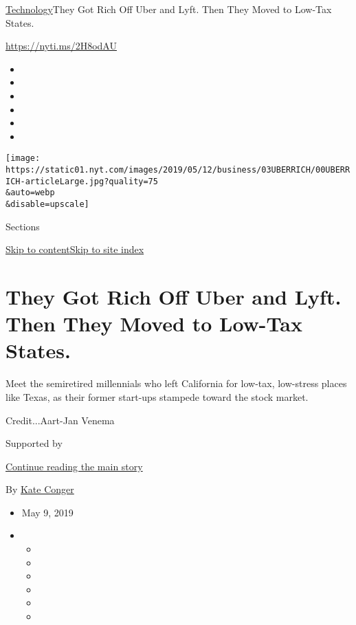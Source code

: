 \href{/section/technology}{Technology}\textbar{}They Got Rich Off Uber
and Lyft. Then They Moved to Low-Tax States.

\url{https://nyti.ms/2H8odAU}

\begin{itemize}
\item
\item
\item
\item
\item
\item
\end{itemize}

\texttt{[image: https://static01.nyt.com/images/2019/05/12/business/03UBERRICH/00UBERRICH-articleLarge.jpg?quality=75\\\&auto=webp\\\&disable=upscale]}

Sections

\protect\hyperlink{site-content}{Skip to
content}\protect\hyperlink{site-index}{Skip to site index}

\hypertarget{they-got-rich-off-uber-and-lyft-then-they-moved-to-low-tax-states}{%
\section{They Got Rich Off Uber and Lyft. Then They Moved to Low-Tax
States.}\label{they-got-rich-off-uber-and-lyft-then-they-moved-to-low-tax-states}}

Meet the semiretired millennials who left California for low-tax,
low-stress places like Texas, as their former start-ups stampede toward
the stock market.

Credit...Aart-Jan Venema

Supported by

\protect\hyperlink{after-sponsor}{Continue reading the main story}

By \href{https://www.nytimes.com/by/kate-conger}{Kate Conger}

\begin{itemize}
\item
  May 9, 2019
\item
  \begin{itemize}
  \item
  \item
  \item
  \item
  \item
  \item
  \end{itemize}
\end{itemize}

